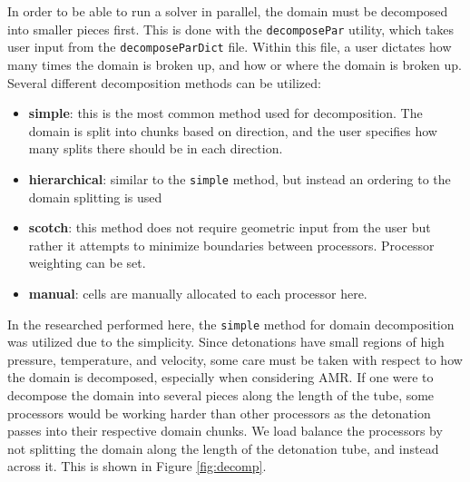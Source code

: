 In order to be able to run a solver in parallel, the domain must be decomposed into smaller pieces first. This is done with the \verb|decomposePar| utility, which takes user input from the \verb|decomposeParDict| file. Within this file, a user dictates how many times the domain is broken up, and how or where the domain is broken up. Several different decomposition methods can be utilized:
\begin{itemize}
\item \textbf{simple}: this is the most common method used for decomposition. The domain is split into chunks based on direction, and the user specifies how many splits there should be in each direction. 
\item \textbf{hierarchical}: similar to the \verb|simple| method, but instead an ordering to the domain splitting is used
\item \textbf{scotch}: this method does not require geometric input from the user but rather it attempts to minimize boundaries between processors. Processor weighting can be set. 
\item \textbf{manual}: cells are manually allocated to each processor here. 
\end{itemize}
In the researched performed here, the \verb|simple| method for domain decomposition was utilized due to the simplicity. Since detonations have small regions of high pressure, temperature, and velocity, some care must be taken with respect to how the domain is decomposed, especially when considering AMR. If one were to decompose the domain into several pieces along the length of the tube, some processors would be working harder than other processors as the detonation passes into their respective domain chunks. We load balance the processors by not splitting the domain along the length of the detonation tube, and instead across it. This is shown in Figure \ref{fig:decomp}. 

